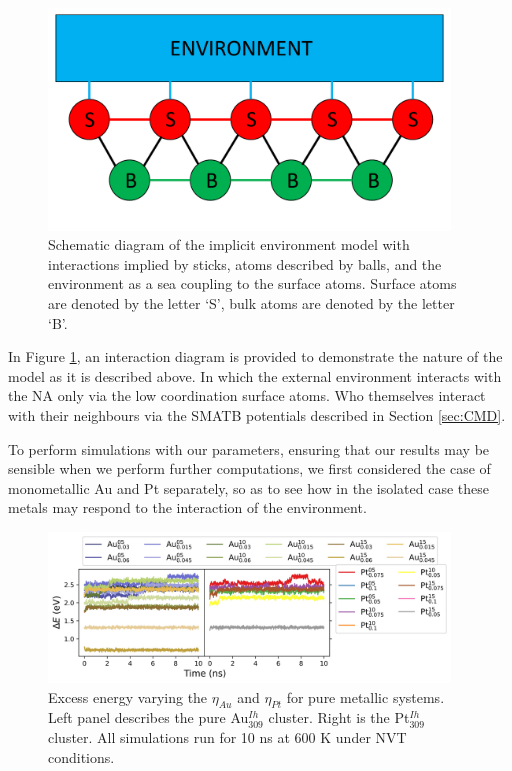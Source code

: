 \begin{figure}[h!]
    \centering
    \includegraphics[width=0.95\textwidth]{figures/MD/Env/SMATB_Env.pdf}
    \caption{Schematic diagram of the implicit environment model with interactions implied by sticks, atoms described by balls, and the environment as a sea coupling to the surface atoms. Surface atoms are denoted by the letter `S', bulk atoms are denoted by the letter `B'.}
    \label{fig:SMATB_Env}
\end{figure}

In Figure \ref{fig:SMATB_Env}, an interaction diagram is provided to demonstrate the nature of the model as it is described above. In which the external environment interacts with the NA only via the low coordination surface atoms. Who themselves interact with their neighbours via the SMATB potentials described in Section \ref{sec:CMD}.

To perform  simulations with our parameters, ensuring that our results may be sensible when we perform further computations, we first considered the case of monometallic Au and Pt separately, so as to see how in the isolated case these metals may respond to the interaction of the environment.

\begin{figure}[h!]
     \centering
         \includegraphics[width=0.95\textwidth]{figures/MD/Env/Env_Pure.jpeg}
    \caption{Excess energy varying the $\eta_{Au}$ and $\eta_{Pt}$ for pure metallic systems. Left panel describes the pure Au$_{309}^{Ih}$ cluster. Right is the Pt$_{309}^{Ih}$ cluster. All simulations run for 10 ns at 600 K under NVT conditions.}
    \label{fig:Pure_eta}
\end{figure}

